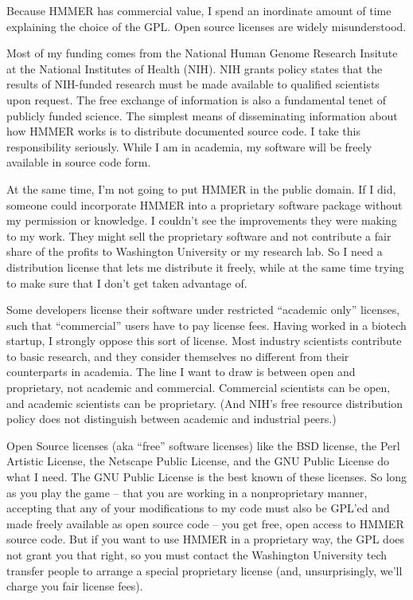 Because HMMER has commercial value, I spend an inordinate amount of
time explaining the choice of the GPL. Open source licenses are widely
misunderstood.

Most of my funding comes from the National Human Genome Research
Insitute at the National Institutes of Health (NIH). NIH grants policy
states that the results of NIH-funded research must be made available
to qualified scientists upon request. The free exchange of information
is also a fundamental tenet of publicly funded science. The simplest
means of disseminating information about how HMMER works is to
distribute documented source code. I take this responsibility
seriously. While I am in academia, my software will be freely
available in source code form.

At the same time, I'm not going to put HMMER in the public domain.  If
I did, someone could incorporate HMMER into a proprietary software
package without my permission or knowledge. I couldn't see the
improvements they were making to my work.  They might sell the
proprietary software and not contribute a fair share of the profits to
Washington University or my research lab. So I need a distribution
license that lets me distribute it freely, while at the same time
trying to make sure that I don't get taken advantage of.

Some developers license their software under restricted ``academic
only'' licenses, such that ``commercial'' users have to pay license
fees. Having worked in a biotech startup, I strongly oppose this sort
of license. Most industry scientists contribute to basic research, and
they consider themselves no different from their counterparts in
academia. The line I want to draw is between open and proprietary, not
academic and commercial. Commercial scientists can be open, and
academic scientists can be proprietary. (And NIH's free resource
distribution policy does not distinguish between academic and
industrial peers.)

Open Source licenses (aka ``free'' software licenses) like the BSD
license, the Perl Artistic License, the Netscape Public License, and
the GNU Public License do what I need. The GNU Public License is the
best known of these licenses. So long as you play the game -- that you
are working in a nonproprietary manner, accepting that any of your
modifications to my code must also be GPL'ed and made freely available
as open source code -- you get free, open access to HMMER source code.
But if you want to use HMMER in a proprietary way, the GPL does not
grant you that right, so you must contact the Washington University
tech transfer people to arrange a special proprietary license (and,
unsurprisingly, we'll charge you fair license fees).

